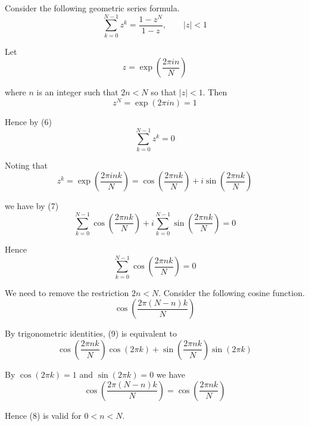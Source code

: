 Consider the following geometric series formula.
\begin{equation*}
\sum_{k=0}^{N-1}z^k=\frac{1-z^N}{1-z},\qquad|z|<1
\tag{6}
\end{equation*}

Let
\begin{equation*}
z=\exp\left(\frac{2\pi in}{N}\right)
\end{equation*}

where $n$ is an integer such that $2n<N$ so that $|z|<1$.
Then
\begin{equation*}
z^N=\exp(2\pi in)=1
\end{equation*}

Hence by (6)
\begin{equation*}
\sum_{k=0}^{N-1}z^k=0
\tag{7}
\end{equation*}

Noting that
\begin{equation*}
z^k=\exp\left(\frac{2\pi ink}{N}\right)=\cos\left(\frac{2\pi nk}{N}\right)+i\sin\left(\frac{2\pi nk}{N}\right)
\end{equation*}

we have by (7)
\begin{equation*}
\sum_{k=0}^{N-1}\cos\left(\frac{2\pi nk}{N}\right)+i\sum_{k=0}^{N-1}\sin\left(\frac{2\pi nk}{N}\right)=0
\end{equation*}

Hence
\begin{equation*}
\sum_{k=0}^{N-1}\cos\left(\frac{2\pi nk}{N}\right)=0
\tag{8}
\end{equation*}

We need to remove the restriction $2n<N$.
Consider the following cosine function.
\begin{equation*}
\cos\left(\frac{2\pi(N-n)k}{N}\right)
\tag{9}
\end{equation*}

By trigonometric identities, (9) is equivalent to
\begin{equation*}
\cos\left(\frac{2\pi nk}{N}\right)\cos(2\pi k)
+\sin\left(\frac{2\pi nk}{N}\right)\sin(2\pi k)
\end{equation*}

By $\cos(2\pi k)=1$ and $\sin(2\pi k)=0$ we have
\begin{equation*}
\cos\left(\frac{2\pi(N-n)k}{N}\right)=\cos\left(\frac{2\pi nk}{N}\right)
\tag{10}
\end{equation*}

Hence (8) is valid for $0<n<N$.

